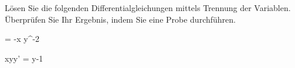 \begin{atiTask}[
	title = Zwei separable Differentialgleichungen,
	language = Deutsch
]
	Lösen Sie die folgenden Differentialgleichungen mittels Trennung der Variablen.
	Überprüfen Sie Ihr Ergebnis, indem Sie eine Probe
	durchführen.
	\begin{atiSubequations}
		\item{
			 = -\tan x \cdot y^{-2}
		}
		\item{
			xyy' = y-1
		}
	\end{atiSubequations}
\end{atiTask}